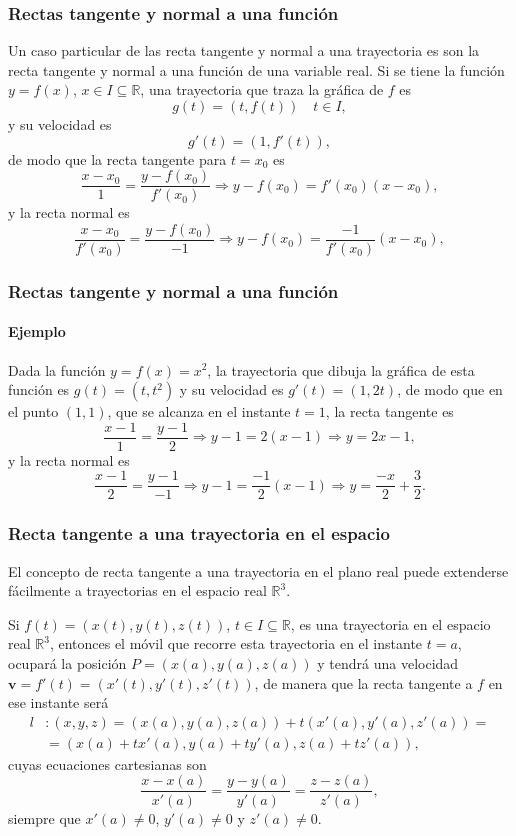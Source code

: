 \begin{frame}
	\frametitle{Rectas tangente y normal a una función}
	Un caso particular de las recta tangente y normal a una trayectoria es son la recta tangente y normal a una función de una variable real.
	Si se tiene la función $y=f(x)$, $x\in I\subseteq \mathbb{R}$, una trayectoria que traza la gráfica de $f$ es
	\[
		g(t) = (t,f(t))  \quad t\in I,
	\]
	y su velocidad es
	\[
		g'(t) = (1,f'(t)),
	\]
	de modo que la recta tangente para $t=x_0$ es
	\[
		\frac{x-x_0}{1} = \frac{y-f(x_0)}{f'(x_0)} \Rightarrow y-f(x_0) = f'(x_0)(x-x_0),
	\]
	y la recta normal es
	\[
		\frac{x-x_0}{f'(x_0)} = \frac{y-f(x_0)}{-1} \Rightarrow y-f(x_0) = \frac{-1}{f'(x_0)}(x-x_0),
	\]
\end{frame}


\begin{frame}
	\frametitle{Rectas tangente y normal a una función}
	\framesubtitle{Ejemplo}
	Dada la función $y=f(x)=x^2$, la trayectoria que dibuja la gráfica de esta función es $g(t)=(t,t^2)$ y su velocidad es
	$g'(t)=(1,2t)$, de modo que en el punto $(1,1)$, que se alcanza en el instante $t=1$, la recta tangente es
	\[
		\frac{x-1}{1} = \frac{y-1}{2} \Rightarrow y-1 = 2(x-1) \Rightarrow y = 2x-1,
	\]
	y la recta normal es
	\[
		\frac{x-1}{2} = \frac{y-1}{-1} \Rightarrow y-1 = \frac{-1}{2}(x-1) \Rightarrow y = \frac{-x}{2}+\frac{3}{2}.
	\]
	\begin{center}
		\scalebox{0.8}{}
	\end{center}
\end{frame}


\begin{frame}
	\frametitle{Recta tangente a una trayectoria en el espacio}
	El concepto de recta tangente a una trayectoria en el plano real puede extenderse fácilmente a trayectorias en el espacio real $\mathbb{R}^3$.
	
	Si $f(t)=(x(t),y(t),z(t))$, $t\in I\subseteq \mathbb{R}$, es una trayectoria en el espacio real $\mathbb{R}^3$, entonces
	el móvil que recorre esta trayectoria en el instante $t=a$, ocupará la posición $P=(x(a),y(a),z(a))$ y tendrá una velocidad $\mathbf{v}=f'(t)=(x'(t),y'(t),z'(t))$, de manera que la recta tangente a $f$ en ese instante será
	\begin{align*}
		l & : (x,y,z)=(x(a),y(a),z(a))+t(x'(a),y'(a),z'(a)) = \\
		  & = (x(a)+tx'(a),y(a)+ty'(a),z(a)+tz'(a)),          
	\end{align*}
	cuyas ecuaciones cartesianas son
	\[
		\frac{x-x(a)}{x'(a)}=\frac{y-y(a)}{y'(a)}=\frac{z-z(a)}{z'(a)},
	\]
	siempre que $x'(a)\neq 0$, $y'(a)\neq 0$ y $z'(a)\neq 0$.
\end{frame}


